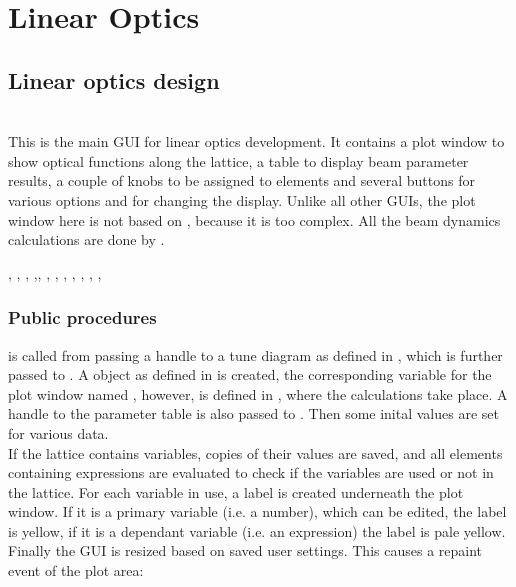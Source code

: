 \documentclass[12pt]{article}
\newcommand\code[1]{{\tt #1}}
\newcommand\guico[1]{{\color{blue}\code{#1}}}
\newcommand\guifco[1]{{\color{violet}\code{#1}}}
\newcommand{\unico}[1]{{\color{burntorange}\code{#1}}}
\newcommand{\opagui}[1]{\colorbox{blue!20}{{\color{black}\code{#1}}}}
\newcommand{\oguih}[2]{\subsection{\label{#2}#1}{\Huge\opagui{#2}}\\}
\newcommand{\ogui}[1]{\hyperref[#1]{\opagui{#1}}}
\newcommand{\opaguif}[1]{\colorbox{violet!30}{{\color{black}\code{#1}}}}
\newcommand{\oguif}[1]{\hyperref[#1]{\opaguif{#1}}}
\newcommand{\opauni}[1]{\colorbox{orange!30}{{\color{black}\code{#1}}}}
\newcommand{\ouni}[1]{\hyperref[#1]{\opauni{#1}}}
\newcommand{\uses}[1]{\flushleft {\bf Uses:} #1}
\newcommand{\desc}[1]{#1}
\newcommand{\ppro}[1]{\subsubsection*{Public procedures} #1}
\begin{document}
\section{\label{seclino}Linear Optics}

\oguih{Linear optics design}{opalinop} 

\desc{This is the main GUI for linear optics development. It contains a plot window to show optical functions along the lattice, a table to display beam parameter results, a couple of knobs to be assigned to elements and several buttons for various options and for changing the display. Unlike all other GUIs, the plot window here is not based on \oguif{../com/asfigure}, because it is too complex. All the beam dynamics calculations are done by \ouni{linoplib}.}

\uses{\oguif{knobframe}, \ogui{ostartmenu}, \ogui{otunematrix}, \ogui{owriteomrk},\ogui{obetenvmag}, \ogui{omatching}, \ouni{linoplib}, \ogui{opatunediag}, \ogui{oeleedit}, \ouni{globlib}, \ouni{mathlib}, \oguif{../com/vgraph}, \ouni{../com/asaux}} 

\ppro{
\guico{Init} is called from \ogui{opamenu} passing a handle to a tune diagram as defined in \ogui{opatunediag}, which is further passed to \ouni{linoplib}. A \guifco{Vplot} object as defined in \oguif{../com/vgraph} is created, the corresponding variable for the plot window named \unico{vp}, however, is defined in \ouni{linoplib}, where the calculations take place. A handle to the parameter table \guico{tab} is also passed to \ouni{linoplib}. Then some inital values are set for various data.\\
If the lattice contains variables, copies of their values are saved, and all elements containing expressions are evaluated to check if the variables are used or not in the lattice. For each variable in use, a label is created underneath the plot window. If it is a primary variable (i.e. a number), which can be edited, the label is yellow, if it is a dependant variable (i.e. an expression) the label is pale yellow.\\
Finally the GUI is resized based on saved user settings. This causes a repaint event of the plot area:
}
\end{document}
